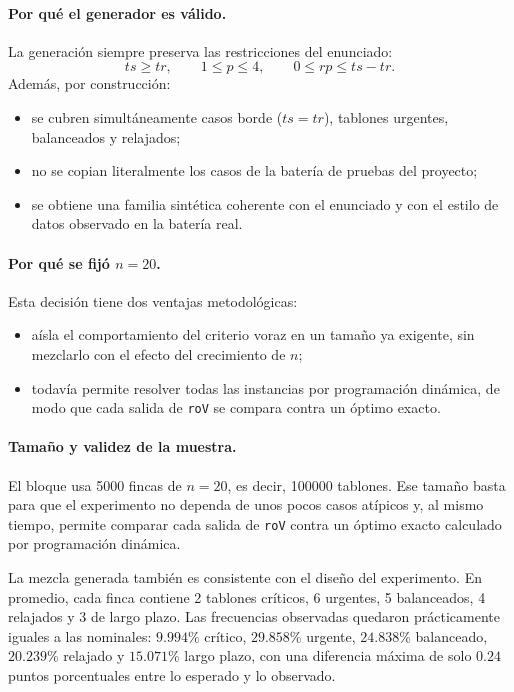\documentclass[12pt,a4paper]{article}
\begin{document}
\paragraph{Por qu\'e el generador es v\'alido.}
La generaci\'on siempre preserva las restricciones del enunciado:
\[
ts \geq tr,\qquad 1 \leq p \leq 4,\qquad 0 \leq rp \leq ts-tr.
\]
Adem\'as, por construcci\'on:
\begin{itemize}
  \item se cubren simult\'aneamente casos borde (\(ts=tr\)), tablones urgentes, balanceados y relajados;
  \item no se copian literalmente los casos de la bater\'ia de pruebas del proyecto;
  \item se obtiene una familia sint\'etica coherente con el enunciado y con el estilo de datos observado en la bater\'ia real.
\end{itemize}

\paragraph{Por qu\'e se fij\'o \(n=20\).}
Esta decisi\'on tiene dos ventajas metodol\'ogicas:
\begin{itemize}
  \item a\'isla el comportamiento del criterio voraz en un tama\~no ya exigente, sin mezclarlo con el efecto del crecimiento de \(n\);
  \item todav\'ia permite resolver todas las instancias por programaci\'on din\'amica, de modo que cada salida de \texttt{roV} se compara contra un \'optimo exacto.
\end{itemize}

\paragraph{Tama\~no y validez de la muestra.}
El bloque usa 5000 fincas de \(n=20\), es decir, 100000 tablones. Ese tama\~no basta para que el experimento no dependa de unos pocos casos at\'ipicos y, al mismo tiempo, permite comparar cada salida de \texttt{roV} contra un \'optimo exacto calculado por programaci\'on din\'amica.

La mezcla generada tambi\'en es consistente con el dise\~no del experimento. En promedio, cada finca contiene 2 tablones cr\'iticos, 6 urgentes, 5 balanceados, 4 relajados y 3 de largo plazo. Las frecuencias observadas quedaron pr\'acticamente iguales a las nominales: \(9.994\%\) cr\'itico, \(29.858\%\) urgente, \(24.838\%\) balanceado, \(20.239\%\) relajado y \(15.071\%\) largo plazo, con una diferencia m\'axima de solo \(0.24\) puntos porcentuales entre lo esperado y lo observado.
\end{document}
